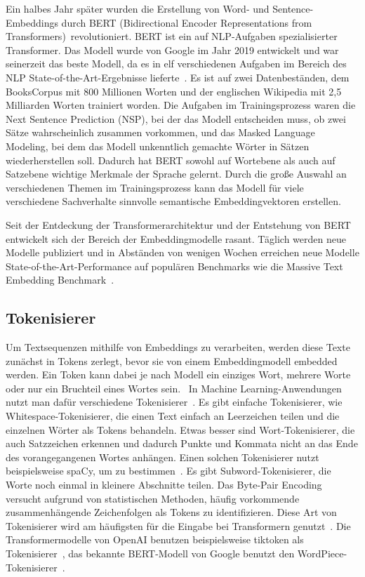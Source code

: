 Ein halbes Jahr später wurden die Erstellung von Word- und Sentence-Embeddings durch BERT (Bidirectional Encoder Representations from Transformers)~\cite{devlin2019}revolutioniert.
BERT ist ein auf NLP-Aufgaben spezialisierter Transformer.
Das Modell wurde von Google im Jahr 2019 entwickelt und war seinerzeit das beste Modell, da es in elf verschiedenen Aufgaben im Bereich des NLP State-of-the-Art-Ergebnisse lieferte~\cite{devlin2019}.
Es ist auf zwei Datenbeständen, dem BooksCorpus mit 800 Millionen Worten und der englischen Wikipedia mit 2,5 Milliarden Worten trainiert worden.
Die Aufgaben im Trainingsprozess waren die Next Sentence Prediction (NSP), bei der das Modell entscheiden muss, ob zwei Sätze wahrscheinlich zusammen vorkommen, und das Masked Language Modeling, bei dem das Modell unkenntlich gemachte Wörter in Sätzen wiederherstellen soll.
Dadurch hat BERT sowohl auf Wortebene als auch auf Satzebene wichtige Merkmale der Sprache gelernt.
Durch die große Auswahl an verschiedenen Themen im Trainingsprozess kann das Modell für viele verschiedene Sachverhalte sinnvolle semantische Embeddingvektoren erstellen.~\cite{devlin2019}

Seit der Entdeckung der Transformerarchitektur und der Entstehung von BERT entwickelt sich der Bereich der Embeddingmodelle rasant.
Täglich werden neue Modelle publiziert und in Abständen von wenigen Wochen erreichen neue Modelle State-of-the-Art-Performance auf populären Benchmarks wie die Massive Text Embedding Benchmark~\cite{muennighoff2023}.

\subsection{Tokenisierer}

Um Textsequenzen mithilfe von Embeddings zu verarbeiten, werden diese Texte zunächst in Tokens zerlegt, bevor sie von einem Embeddingmodell embedded werden.
Ein Token kann dabei je nach Modell ein einziges Wort, mehrere Worte oder nur ein Bruchteil eines Wortes sein.~\cite{he2006}
In Machine Learning-Anwendungen nutzt man dafür verschiedene Tokenisierer~\cite{zouhar2023}.
Es gibt einfache Tokenisierer, wie Whitespace-Tokenisierer, die einen Text einfach an Leerzeichen teilen und die einzelnen Wörter als Tokens behandeln.
Etwas besser sind Wort-Tokenisierer, die auch Satzzeichen erkennen und dadurch Punkte und Kommata nicht an das Ende des vorangegangenen Wortes anhängen.
Einen solchen Tokenisierer nutzt beispielsweise spaCy, um  zu bestimmen~\cite{honnibal2017}.
Es gibt Subword-Tokenisierer, die Worte noch einmal in kleinere Abschnitte teilen.
Das Byte-Pair Encoding versucht aufgrund von statistischen Methoden, häufig vorkommende zusammenhängende Zeichenfolgen als Tokens zu identifizieren.
Diese Art von Tokenisierer wird am häufigsten für die Eingabe bei Transformern genutzt~\cite{zouhar2023}.
Die Transformermodelle von OpenAI benutzen beispielsweise tiktoken als Tokenisierer~\cite{tiktoken2024}, das bekannte BERT-Modell von Google benutzt den WordPiece-Tokenisierer~\cite{devlin2019}.

